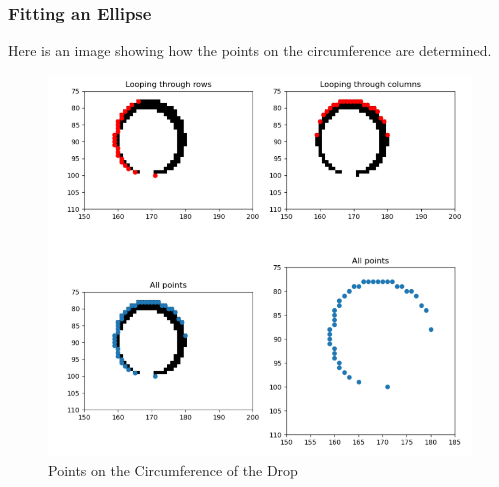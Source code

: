 \documentclass{beamer}
\begin{document}
\begin{frame}
    \frametitle{Fitting an Ellipse}
    Here is an image showing how the points on the circumference are determined.\\
    \begin{figure}
        \centering
        \includegraphics[scale=0.5]{all_points.png}
        \caption[]{Points on the Circumference of the Drop}
    \end{figure}
\end{frame}
\end{document}
